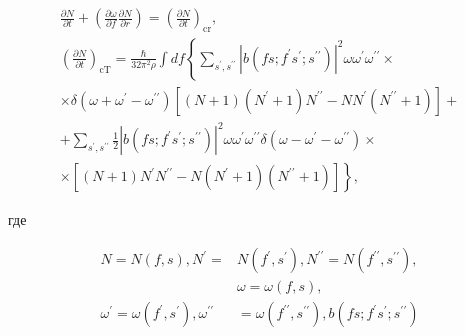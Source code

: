 \documentclass[10pt]{article}
\begin{document}
\[

\begin{gathered}

\frac{\partial N}{\partial t}+\left(\frac{\partial \omega}{\partial f} \frac{\partial N}{\partial r}\right)=\left(\frac{\partial N}{\partial t}\right)_{\mathrm{cr}}, \\

\left(\frac{\partial N}{\partial t}\right)_{\mathrm{cT}}=\frac{\hbar}{32 \pi^{2} \rho} \int d f\left\{\sum_{s^{\prime}, s^{\prime \prime}}\left|b\left(f s ; f^{\prime} s^{\prime} ; s^{\prime \prime}\right)\right|^{2} \omega \omega^{\prime} \omega^{\prime \prime} \times\right. \\

\times \delta\left(\omega+\omega^{\prime}-\omega^{\prime \prime}\right)\left[(N+1)\left(N^{\prime}+1\right) N^{\prime \prime}-N N^{\prime}\left(N^{\prime \prime}+1\right)\right]+ \\

+\sum_{s^{\prime}, s^{\prime \prime}} \frac{1}{2}\left|b\left(f s ; f^{\prime} s^{\prime} ; s^{\prime \prime}\right)\right|^{2} \omega \omega^{\prime} \omega^{\prime \prime} \delta\left(\omega-\omega^{\prime}-\omega^{\prime \prime}\right) \times \\

\left.\times\left[(N+1) N^{\prime} N^{\prime \prime}-N\left(N^{\prime}+1\right)\left(N^{\prime \prime}+1\right)\right]\right\},

\end{gathered}

\]



где



\[

\begin{aligned}

N=N(f, s), N^{\prime}= & N\left(f^{\prime}, s^{\prime}\right), N^{\prime \prime}=N\left(f^{\prime \prime}, s^{\prime \prime}\right), \\

& \omega=\omega(f, s), \\

\omega^{\prime}=\omega\left(f^{\prime}, s^{\prime}\right), \omega^{\prime \prime} & =\omega\left(f^{\prime \prime}, s^{\prime \prime}\right), b\left(f s ; f^{\prime} s^{\prime} ; s^{\prime \prime}\right)

\end{aligned}

\]
\end{document}

